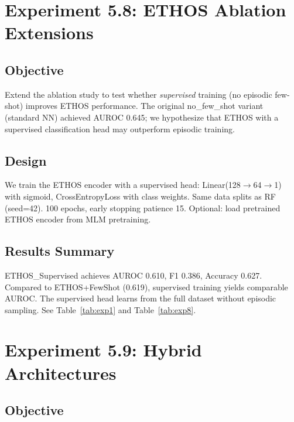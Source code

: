 \section{Experiment 5.8: ETHOS Ablation Extensions}
\label{sec:ethos-ablation}

\subsection{Objective}

Extend the ablation study to test whether \emph{supervised} training (no episodic few-shot) improves ETHOS performance. The original no\_few\_shot variant (standard NN) achieved AUROC 0.645; we hypothesize that ETHOS with a supervised classification head may outperform episodic training.

\subsection{Design}

We train the ETHOS encoder with a supervised head: Linear(128$\to$64$\to$1) with sigmoid, CrossEntropyLoss with class weights. Same data splits as RF (seed=42). 100 epochs, early stopping patience 15. Optional: load pretrained ETHOS encoder from MLM pretraining.

\subsection{Results Summary}

ETHOS\_Supervised achieves AUROC 0.610, F1 0.386, Accuracy 0.627. Compared to ETHOS+FewShot (0.619), supervised training yields comparable AUROC. The supervised head learns from the full dataset without episodic sampling. See Table~\ref{tab:exp1} and Table~\ref{tab:exp8}.

\section{Experiment 5.9: Hybrid Architectures}
\label{sec:exp-hybrid}

\subsection{Objective}

